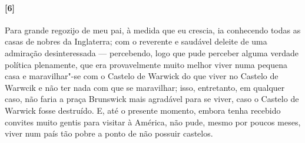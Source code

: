 \paragraph{[6]} Para grande regozijo de meu pai, à medida que eu crescia, ia
conhecendo todas as casas de nobres da Inglaterra; com o reverente e
saudável deleite de uma admiração desinteressada --- percebendo, logo que
pude perceber alguma verdade política plenamente, que era provavelmente
muito melhor viver numa pequena casa e maravilhar"-se com o Castelo de
Warwick do que viver no Castelo de Warwcik e não ter nada com que se
maravilhar; isso, entretanto, em qualquer caso, não faria a praça
Brunswick mais agradável para se viver, caso o Castelo de Warwick fosse
destruído. E, até o presente momento, embora tenha recebido convites
muito gentis para visitar à América, não pude, mesmo por poucos meses,
viver num país tão pobre a ponto de não possuir castelos.

